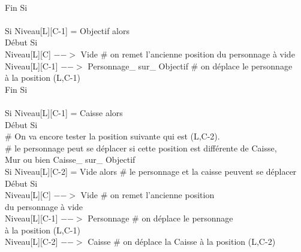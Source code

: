 \documentclass{article}
\begin{document}
\begin{tabbing}
\\	\hspace{3cm}	Fin Si 
\\		
\\	\hspace{3cm}	Si Niveau[L][C-1] = Objectif alors			
\\	\hspace{3cm}	Début Si
\\	\hspace{4cm}		Niveau[L][C] $-->$ Vide 				\# on remet l'ancienne position du personnage à vide
\\	\hspace{4cm}		Niveau[L][C-1] $-->$ Personnage\_ sur\_ Objectif	\# on déplace le personnage
\\ \hspace{4cm} à la position (L,C-1)
\\	\hspace{3cm}	Fin Si 
\\		
\\	\hspace{3cm}	Si Niveau[L][C-1] = Caisse alors			
\\	\hspace{3cm}	Début Si
\\	\hspace{4cm}		\# On va encore tester la position suivante qui est (L,C-2). 
\\	\hspace{4cm}		\# le personnage peut se déplacer si cette position est différente de Caisse,
\\ \hspace{4cm} Mur ou bien Caisse\_ sur\_ Objectif
\\	\hspace{4cm}		Si Niveau[L][C-2] = Vide alors          \# le personnage et la caisse peuvent se déplacer
\\	\hspace{4cm}		Début Si
\\	\hspace{5cm}			Niveau[L][C] $-->$ Vide 		\# on remet l'ancienne position
\\ \hspace{5cm} du personnage à vide
\\	\hspace{5cm}			Niveau[L][C-1] $-->$ Personnage	\# on déplace le personnage
\\ \hspace{5cm} à la position (L,C-1)
\\	\hspace{5cm}			Niveau[L][C-2] $-->$ Caisse	\# on déplace la Caisse à la position (L,C-2)

\end{tabbing}
\end{document}
